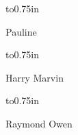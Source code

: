 \vskip 0.25in \vbox to0.75in {\parbox[t]{1in}{Pauline\vfil}\vfil}
\vskip 0.25in \vbox to0.75in {\parbox[t]{1in}{Harry Marvin\vfil}\vfil}
\vskip 0.25in \vbox to0.75in {\parbox[t]{1in}{Raymond Owen\vfil}\vfil}
